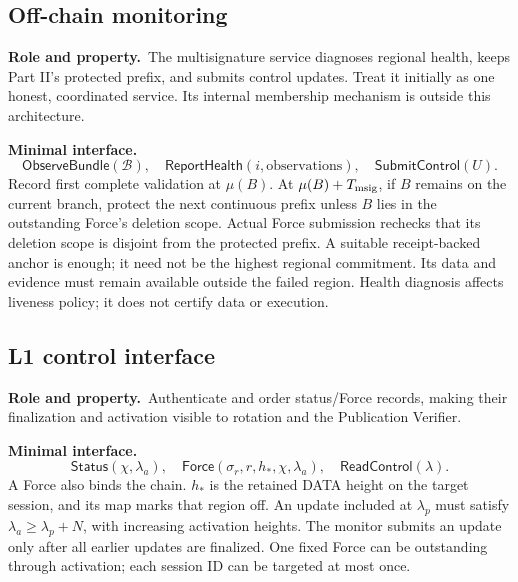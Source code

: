 \documentclass[11pt,a4paper]{article}
\newcommand{\api}[1]{\ensuremath{\mathsf{#1}}}
\newcommand{\role}{\textbf{Role and property.}\ }
\newcommand{\iface}{\textbf{Minimal interface.}\ }
\begin{document}
\subsection{Off-chain monitoring}
\role The multisignature service diagnoses regional health, keeps Part
II's protected prefix, and submits control updates. Treat it initially
as one honest, coordinated service. Its internal membership mechanism
is outside this architecture.

\iface
\[
 \api{ObserveBundle}(\mathcal B),\quad
 \api{ReportHealth}(i,\text{observations}),\quad
 \api{SubmitControl}(U).
\]
Record first complete validation at $\mu(B)$. At
$\mu(B)+T_{\rm msig}$, if $B$ remains on the current branch, protect the
next continuous prefix unless $B$ lies in the outstanding Force's deletion
scope. Actual Force submission rechecks that its deletion scope is disjoint
from the protected prefix. A suitable receipt-backed anchor is enough;
it need not be the highest regional commitment. Its data and evidence
must remain available outside the failed region. Health diagnosis
affects liveness policy; it does not certify data or execution.

\subsection{L1 control interface}
\role Authenticate and order status/Force records, making their
finalization and activation visible to rotation and the Publication Verifier.

\iface
\[
 \api{Status}(\chi,\lambda_a),\quad
 \api{Force}(\sigma_r,r,h_*,\chi,\lambda_a),\quad
 \api{ReadControl}(\lambda).
\]
A Force also binds the chain. $h_*$ is the retained DATA height on the
target session, and its map marks that region off. An update included
at $\lambda_p$ must satisfy $\lambda_a\ge\lambda_p+N$, with increasing
activation heights. The monitor submits an update only after all earlier
updates are finalized. One fixed Force can be outstanding through
activation; each session ID can be targeted at most once.
\end{document}
